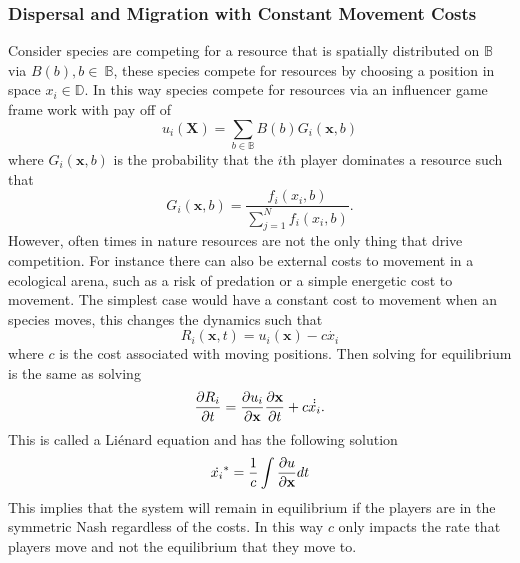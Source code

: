 \documentclass{article}
\begin{document}
            \subsubsection{Dispersal and Migration with Constant Movement Costs}
                Consider species are competing for a resource that is spatially distributed on $\mathbb{B}$ via $B(b), b\in\ \mathbb{B}$, these species compete for resources by choosing a position in space $x_i\in \mathbb{D}$. In this way species compete for resources via an influencer game frame work with pay off of 
                \begin{equation}
                    u_i(\mathbf{X})=\sum_{b\in \mathbb{B}} B(b)G_i(\mathbf{x},b)
                \end{equation}
                where $G_i(\mathbf{x},b)$ is the probability that the $i$th player dominates a resource such that
                \begin{equation}
                    G_i(\mathbf{x},b)=\frac{f_i(x_i,b)}{\sum_{j=1}^{N}f_i(x_i,b)}.
                \end{equation}
                However, often times in nature resources are not the only thing that drive competition. For instance there can also be external costs to movement in a ecological arena, such as a risk of predation or a simple energetic cost to movement. The simplest case would have a constant cost to movement when an species moves, this changes the dynamics such that
                \begin{equation}
                    R_i(\mathbf{x},t)=u_i(\mathbf{x})-c\Dot{x_i}
                \end{equation}
                where $c$ is the cost associated with moving positions. Then solving for equilibrium is the same as solving
                \begin{equation}
                    \pdv{R_i}{t}= \pdv{u_i}{\mathbf{x}}\pdv{\mathbf{x}}{t}+c\Dot{\Dot{x_i}}.
                \end{equation}
                This is called a Li\'enard equation and has the following solution 
                \begin{equation}
                    \Dot{x_i}^*=\frac{1}{c}\int \pdv{u}{\mathbf{x}}dt
                \end{equation}
                This implies that the system will remain in equilibrium if the players are in the symmetric Nash regardless of the costs. In this way $c$ only impacts the rate that players move and not the equilibrium that they move to. 
                       
\end{document}

